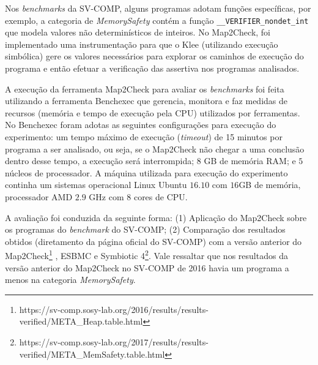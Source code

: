 \par
Nos \textit{benchmarks} da SV-COMP, alguns programas adotam funções específicas, por exemplo, a categoria de \textit{MemorySafety} contém a função \texttt{\_\_VERIFIER\_nondet\_int} que modela valores não determinísticos de inteiros. No Map2Check, foi implementado uma instrumentação para que o Klee (utilizando execução simbólica) gere os valores necessários para explorar os caminhos de execução do programa e então efetuar a verificação das assertiva nos  programas analisados.

\par
A execução da ferramenta Map2Check para avaliar os \textit{benchmarks} foi feita utilizando a ferramenta Benchexec \cite{beyer:2015} que gerencia, monitora e faz medidas de recursos (memória e tempo de execução pela CPU) utilizados por ferramentas. 
%
No Benchexec foram adotas as seguintes configurações para execução do experimento: 
um tempo máximo de execução (\textit{timeout}) de 15 minutos por programa a ser analisado, ou seja, se o Map2Check não chegar a uma conclusão dentro desse tempo, a execução será interrompida; 
$8$ GB de memória RAM; e 
$5$ núcleos de processador.  
A máquina utilizada para execução do experimento continha um sistemas operacional Linux Ubuntu $16.10$ com $16$GB de memória, processador AMD $2.9$ GHz com $8$ cores de CPU. 
%

\par
A avaliação foi conduzida da seguinte forma: 
(1) Aplicação do Map2Check sobre os programas do \textit{benchmark} do SV-COMP; 
(2) Comparação dos resultados obtidos (diretamento da página oficial do SV-COMP) com a versão anterior do Map2Check\footnote{https://sv-comp.sosy-lab.org/2016/results/results-verified/META\_Heap.table.html} \cite{beyer:2016}, ESBMC e Symbiotic 4\footnote{https://sv-comp.sosy-lab.org/2017/results/results-verified/META\_MemSafety.table.html}. 
Vale ressaltar que nos resultados da versão anterior do Map2Check no SV-COMP de 2016 havia um programa a menos na categoria \textit{MemorySafety}.

